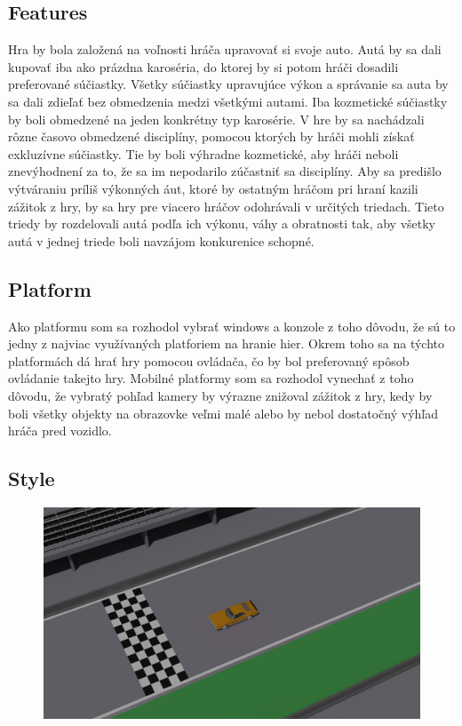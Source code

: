 \documentclass[a4paper,10pt,slovak]{article}
\begin{document}
\subsection*{Features}
Hra by bola založená na voľnosti hráča upravovať si svoje auto. Autá by sa dali kupovať iba ako prázdna karoséria, do ktorej by si potom hráči dosadili preferované súčiastky. Všetky súčiastky upravujúce výkon a správanie sa auta by sa dali zdieľať bez obmedzenia medzi všetkými autami. Iba kozmetické súčiastky by boli obmedzené na jeden konkrétny typ karosérie. V hre by sa nachádzali rôzne časovo obmedzené disciplíny, pomocou ktorých by hráči mohli získať exkluzívne súčiastky. Tie by boli výhradne kozmetické, aby hráči neboli znevýhodnení za to, že sa im nepodarilo zúčastniť sa disciplíny. Aby sa predišlo výtváraniu príliš výkonných áut, ktoré by ostatným hráčom pri hraní kazili zážitok z hry, by sa hry pre viacero hráčov odohrávali v určitých triedach. Tieto triedy by rozdelovali autá podľa ich výkonu, váhy a obratnosti tak, aby všetky autá v jednej triede boli navzájom konkurenice schopné.

\subsection*{Platform}
Ako platformu som sa rozhodol vybrať windows a konzole z toho dôvodu, že sú to jedny z najviac využívaných platforiem na hranie hier. Okrem toho sa na týchto platformách dá hrať hry pomocou ovládača, čo by bol preferovaný spôsob ovládanie takejto hry. Mobilné platformy som sa rozhodol vynechať z toho dôvodu, že vybratý pohľad kamery by výrazne znižoval zážitok z hry, kedy by boli všetky objekty na obrazovke veľmi malé alebo by nebol dostatočný výhľad hráča pred vozidlo.

\subsection*{Style}
\begin{figure}[h]
\centering

\includegraphics[width=\linewidth]{untitled.jpg}
\label{Fig:render}

%
\end{figure}
\end{document}
